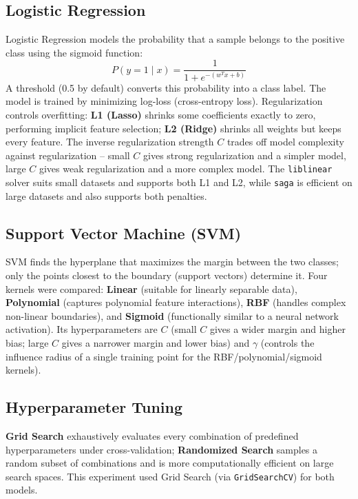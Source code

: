 \documentclass[12pt,a4paper]{article}
\begin{document}
\subsection*{Logistic Regression}
Logistic Regression models the probability that a sample belongs to the positive class using the
sigmoid function:
\begin{equation}
P(y=1 \mid x) = \frac{1}{1 + e^{-(w^T x + b)}}
\end{equation}
A threshold (0.5 by default) converts this probability into a class label. The model is trained
by minimizing log-loss (cross-entropy loss). Regularization controls overfitting: \textbf{L1
(Lasso)} shrinks some coefficients exactly to zero, performing implicit feature selection;
\textbf{L2 (Ridge)} shrinks all weights but keeps every feature. The inverse regularization
strength $C$ trades off model complexity against regularization -- small $C$ gives strong
regularization and a simpler model, large $C$ gives weak regularization and a more complex model.
The \texttt{liblinear} solver suits small datasets and supports both L1 and L2, while
\texttt{saga} is efficient on large datasets and also supports both penalties.

\subsection*{Support Vector Machine (SVM)}
SVM finds the hyperplane that maximizes the margin between the two classes; only the points
closest to the boundary (support vectors) determine it. Four kernels were compared:
\textbf{Linear} (suitable for linearly separable data), \textbf{Polynomial} (captures polynomial
feature interactions), \textbf{RBF} (handles complex non-linear boundaries), and \textbf{Sigmoid}
(functionally similar to a neural network activation). Its hyperparameters are $C$ (small $C$
gives a wider margin and higher bias; large $C$ gives a narrower margin and lower bias) and
$\gamma$ (controls the influence radius of a single training point for the RBF/polynomial/sigmoid
kernels).

\subsection*{Hyperparameter Tuning}
\textbf{Grid Search} exhaustively evaluates every combination of predefined hyperparameters under
cross-validation; \textbf{Randomized Search} samples a random subset of combinations and is more
computationally efficient on large search spaces. This experiment used Grid Search (via
\texttt{GridSearchCV}) for both models.
\end{document}
